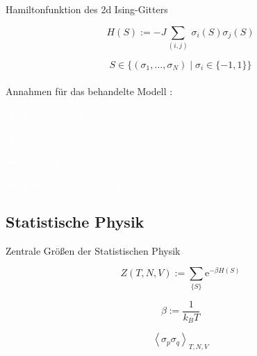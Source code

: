 \documentclass[11pt]{beamer}
\newcommand{\corr}[1]{\left\langle #1 \right\rangle}
\begin{document}
    \begin{frame}{Hamiltonfunktion des 2d Ising-Gitters}
        \begin{grayframe}
            \begin{equation} \nonumber
                H(S) := - J \sum_{(i,j)}  \,\sigma_i(S) \sigma_j(S) 
            \end{equation}
        \end{grayframe}
        \vspace{0.5cm}
        \begin{equation} \nonumber
        S \in \{ \left(\sigma_1, \dots, \sigma_N \right) \;\vert\; \sigma_i \in \{-1,1\} \} 
        \end{equation}\\
        \vspace{0.5cm}
        Annahmen für das behandelte Modell :
        \textcolor{white}{
            \begin{itemize}
                \item Nur nächste Nachbar Wechselwirkung
                \item Isotropie und Homogenität des Modells
                \item Ferromagnetischer Austausch d.h. $J>0$
                \item Kein externes Magnetfeld
            \end{itemize}}
        
    \end{frame}

\subsection{Statistische Physik}
    \begin{frame}{Zentrale Größen der Statistischen Physik}
    
        \begin{grayframe}[frametitle = {Zustandssumme}]
        \begin{equation} \nonumber
            Z(T,N,V) := \sum_{\{S\}} \mathrm{e}^{- \beta H( S ) } 
        \end{equation}
        \end{grayframe}
        
        \vspace{0.5cm}
        \begin{equation} \nonumber
            \beta := \frac{1}{k_B T}
        \end{equation}
        
        \begin{grayframe}[frametitle = {Spin-Spin-Korrelation}]
        \begin{equation} \nonumber
             \corr{\sigma_{p} \sigma_{q}}_{T,N,V}
        \end{equation}   
        \end{grayframe}


    \end{frame}
    
\end{document}
